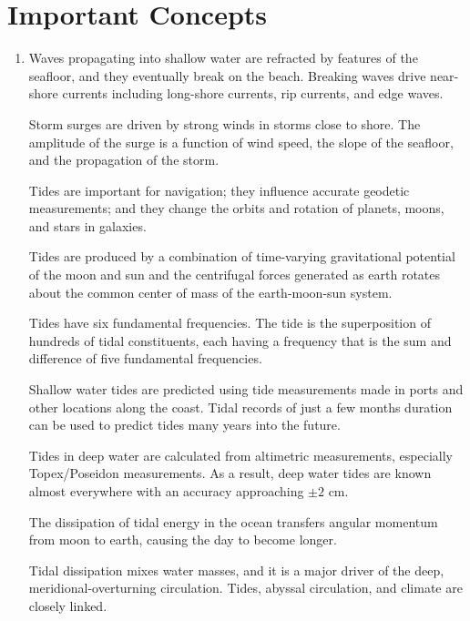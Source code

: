 \section{Important Concepts}
\begin{enumerate}
\item Waves propagating into shallow water are refracted by features of
the seafloor, and they eventually break on the beach. Breaking waves
drive near-shore currents including long-shore currents, rip
currents, and edge waves.
  
\vitem Storm surges are driven by strong winds in storms close to
shore. The amplitude of the surge is a function of wind speed, the
slope of the seafloor, and the propagation of the storm.

\vitem Tides are important for navigation; they influence accurate
geodetic measurements; and they change the orbits and rotation of
planets, moons, and stars in galaxies.

\vitem Tides are produced by a combination of time-varying
gravitational potential of the moon and sun and the centrifugal forces
generated as earth rotates about the common center of mass of the
earth-moon-sun system.

\vitem Tides have six fundamental frequencies. The tide is the
superposition of hundreds of tidal constituents, each having a
frequency that is the sum and difference of five fundamental
frequencies.

\vitem Shallow water tides are predicted using tide measurements made
in ports and other locations along the coast. Tidal records of just a
few months duration can be used to predict tides many years into the
future.

\vitem Tides in deep water are calculated from altimetric
measurements, especially Topex/Poseidon
measurements. As a result, deep water tides are known almost
everywhere with an accuracy approaching $\pm 2$
cm.

\vitem The dissipation of tidal energy in the ocean transfers angular
momentum from moon to earth, causing the day to become
longer.

\vitem Tidal dissipation mixes water masses, and it is a major driver
of the deep, meridional-overturning
circulation. Tides, abyssal
circulation, and climate are closely linked.
\end{enumerate}

